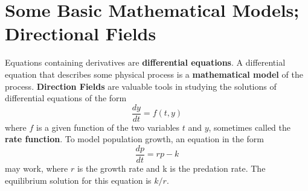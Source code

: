 \section{Some Basic Mathematical Models; Directional Fields}
    Equations containing derivatives are \textbf{differential equations}. 
    \newline
    A differential equation that describes some physical process is a \textbf{mathematical model} of the process.
    \newline
    \textbf{Direction Fields} are valuable tools in studying the solutions of differential equations of the form
    \begin{equation*}
        \frac{dy}{dt} = f(t, y)
    \end{equation*}
    where $f$ is a given function of the two variables $t$ and $y$, sometimes called the \textbf{rate function}.
    \newline
    To model population growth, an equation in the form
    \begin{equation*}
        \frac{dp}{dt} = rp - k
    \end{equation*}
    may work, where $r$ is the growth rate and k is the predation rate. The equilibrium solution for this equation is $k / r$.